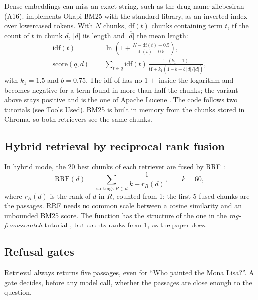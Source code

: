 Dense embeddings can miss an exact string, such as the drug name zilebesiran (A16).  implements Okapi BM25 \citep{robertson2009bm25} with the standard library, as an inverted index over lowercased tokens. With $N$ chunks, $\mathrm{df}(t)$ chunks containing term $t$, $\mathrm{tf}$ the count of $t$ in chunk $d$, $|d|$ its length and $\overline{|d|}$ the mean length:
\begin{align}
\mathrm{idf}(t) &= \ln\!\left(1 + \frac{N - \mathrm{df}(t) + 0.5}{\mathrm{df}(t) + 0.5}\right),\\
\mathrm{score}(q,d) &= \sum_{t\in q} \mathrm{idf}(t)\,\frac{\mathrm{tf}\,(k_1+1)}{\mathrm{tf} + k_1\left(1 - b + b\,|d|/\overline{|d|}\right)},
\end{align}
with $k_1 = 1.5$ and $b = 0.75$. The idf of \citet{robertson2009bm25} has no $1+$ inside the logarithm and becomes negative for a term found in more than half the chunks; the variant above stays positive and is the one of Apache Lucene \citep{lucenebm25}. The code follows two tutorials \citep{loria_tfidf,boyter_vsm} (see Tools Used). BM25 is built in memory from the chunks stored in Chroma, so both retrievers see the same chunks.

\subsection{Hybrid retrieval by reciprocal rank fusion}

In hybrid mode, the 20 best chunks of each retriever are fused by RRF \citep{cormack2009rrf}:
\begin{equation}
\mathrm{RRF}(d) = \sum_{\text{rankings } R \ni d} \frac{1}{k + r_R(d)}, \qquad k = 60,
\end{equation}
where $r_R(d)$ is the rank of $d$ in $R$, counted from 1; the first 5 fused chunks are the passages. RRF needs no common scale between a cosine similarity and an unbounded BM25 score. The function  has the structure of the one in the \emph{rag-from-scratch} tutorial \citep{ragfromscratch}, but counts ranks from 1, as the paper does.

\subsection{Refusal gates}
\label{sec:gates}

Retrieval always returns five passages, even for ``Who painted the Mona Lisa?''. A gate decides, before any model call, whether the passages are close enough to the question.

